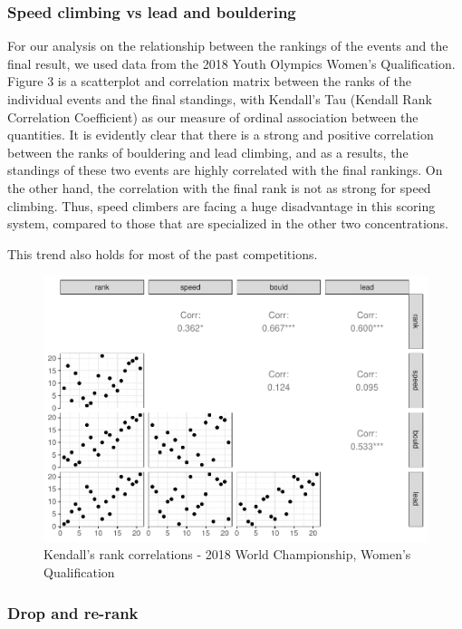 \documentclass[12pt]{article}
\begin{document}
\hypertarget{speed-climbing-vs-lead-and-bouldering}{%
\subsubsection{Speed climbing vs lead and
bouldering}\label{speed-climbing-vs-lead-and-bouldering}}

For our analysis on the relationship between the rankings of the events
and the final result, we used data from the 2018 Youth Olympics Women's
Qualification. Figure 3 is a scatterplot and correlation matrix between
the ranks of the individual events and the final standings, with
Kendall's Tau (Kendall Rank Correlation Coefficient) as our measure of
ordinal association between the quantities. It is evidently clear that
there is a strong and positive correlation between the ranks of
bouldering and lead climbing, and as a results, the standings of these
two events are highly correlated with the final rankings. On the other
hand, the correlation with the final rank is not as strong for speed
climbing. Thus, speed climbers are facing a huge disadvantage in this
scoring system, compared to those that are specialized in the other two
concentrations.

This trend also holds for most of the past competitions.

\begin{figure}
\centering
\includegraphics{draft_files/figure-latex/unnamed-chunk-9-1.pdf}
\caption{Kendall's rank correlations - 2018 World Championship, Women's
Qualification}
\end{figure}

\hypertarget{drop-and-re-rank}{%
\subsubsection{Drop and re-rank}\label{drop-and-re-rank}}
\end{document}
